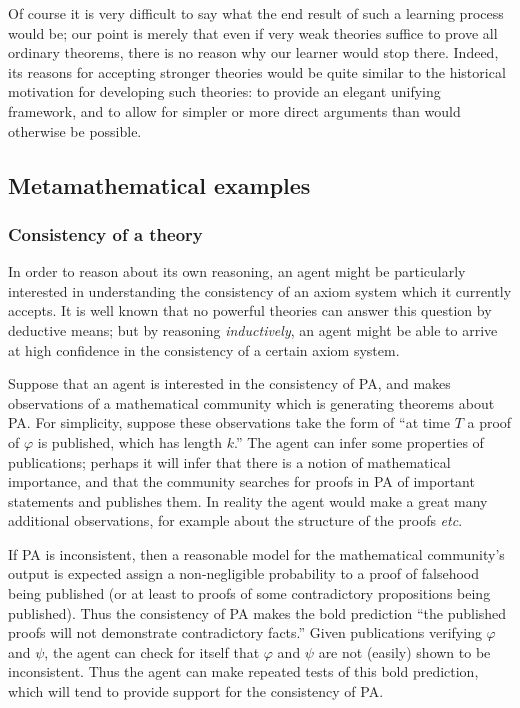 \documentclass[12pt]{article}
\theoremstyle{definition}
\newcommand{\vp}{\varphi}
\begin{document}
Of course it is very difficult to say what the end result
of such a learning process would be;
our point is merely that even if
very weak theories suffice to prove all ordinary
theorems, there is no reason why our learner
would stop there.
Indeed, its reasons for accepting stronger theories would be quite similar
to the historical motivation for developing such theories: to provide an elegant unifying
framework, and to allow for simpler or more direct arguments
than would otherwise be possible.

\subsection{Metamathematical examples}\label{metamath}

\subsubsection{Consistency of a theory}

In order to reason about its own reasoning,
an agent might be particularly interested in understanding
the consistency of an axiom system which it currently accepts.
It is well known that no powerful theories
can answer this question by deductive means;
but by reasoning \emph{inductively}, an agent might be able
to arrive at high confidence in the consistency of a certain axiom system.

Suppose that an agent is interested in the consistency of PA,
and makes observations of a mathematical community which is generating
theorems about PA.
For simplicity, suppose these observations take the form of ``at time $T$ a proof
of $\vp$ is published, which has length $k$.''
The agent can infer some properties of publications;
perhaps it will infer that there is a notion of
mathematical importance,
and that the community
searches for proofs in PA of important statements and publishes them.
In reality the agent would make a great many additional observations,
for example about the structure of the proofs \emph{etc}.

If PA is inconsistent, then a reasonable model for the mathematical
community's output is expected assign a non-negligible probability
to a proof of falsehood being published (or at least to proofs of some
contradictory propositions being published).
Thus the consistency of PA makes the bold prediction ``the published
proofs will not demonstrate contradictory facts.''
Given publications verifying $\vp$ and $\psi$, the agent
can check for itself that $\vp$ and $\psi$ are not (easily) shown
to be inconsistent.
Thus the agent can make repeated tests of this bold prediction,
which will tend to
provide support for the consistency of PA.
\end{document}
